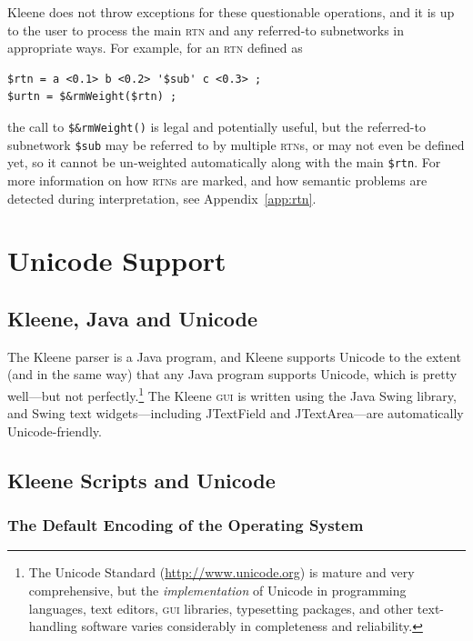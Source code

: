 \documentclass[letterpaper,12pt]{article}
\newcommand{\acro}{\textsc}
\begin{document}
\noindent
Kleene does not throw exceptions for these questionable operations, and it is
up to the user to process the main \acro{rtn} and any referred-to subnetworks
in appropriate ways.  For example, for an \acro{rtn} defined as

\begin{Verbatim}[fontsize=\small]
$rtn = a <0.1> b <0.2> '$sub' c <0.3> ;
$urtn = $&rmWeight($rtn) ;
\end{Verbatim}

\noindent
the call to \verb!$&rmWeight()! is legal and potentially useful, but the
referred-to subnetwork \verb!$sub! may be referred
to by multiple \acro{rtn}s, or may not even be defined yet, so it cannot be
un-weighted automatically along with the main \verb!$rtn!.  For more
information on how \acro{rtn}s are marked, and how semantic problems are
detected during interpretation, see Appendix~\ref{app:rtn}.

\section{Unicode Support}

\subsection{Kleene, Java and Unicode}

The Kleene parser is a Java program, and Kleene supports Unicode to the extent (and
in the same way) that any Java program supports Unicode, which is pretty well---but
not perfectly.\footnote{The Unicode Standard (\url{http://www.unicode.org})
is mature and very comprehensive, but
the \emph{implementation} of Unicode in programming languages, 
text editors, \acro{gui} libraries,
typesetting packages, and other text-handling software varies considerably in completeness
and reliability.}  The
Kleene \acro{gui} is written using the Java Swing library, and Swing text
widgets---including JTextField and JTextArea---are automatically Unicode-friendly.  

\subsection{Kleene Scripts and Unicode}

\subsubsection{The Default Encoding of the Operating System}
\end{document}

